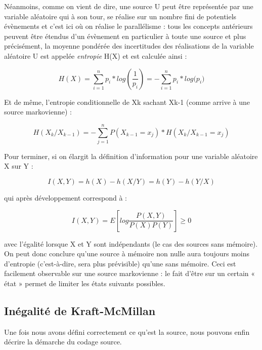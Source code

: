 \documentclass[a4paper,12pt,french]{article}
\begin{document}
    Néanmoins, comme on vient de dire, une source U peut être représentée par une variable aléatoire qui à son tour, se réalise sur un nombre fini de potentiels évènements et c’est ici où on réalise le parallélisme : tous les concepts antérieurs peuvent être étendus d’un évènement en particulier à toute une source et plus précisément, la moyenne pondérée des incertitudes des réalisations de la variable aléatoire U est appelée \textit{entropie} H(X) et est calculée ainsi :

    \begin{equation}
    H(X) = \sum_{i=1}^{n} p_{i} * log (\frac{1}{p_{i}}) = - \sum_{i=1}^{n} {p_{i} * log (p_{i}}) 
    \end{equation}

    Et de même, l’entropie conditionnelle de Xk sachant Xk-1 (comme arrive à une source markovienne) :
    
    \begin{equation}
    H(X_{k}/X_{k-1}) = - \sum_{j=1}^{n} P(X_{k-1} = x_{j}) * H(X_{k}/X_{k-1} = x_{j}) 
    \end{equation}

    Pour terminer, si on élargit la définition d’information pour une variable aléatoire X sur Y :
    
    \begin{equation}
    I (X,Y) = h(X) - h(X/Y) = h(Y) - h(Y/X)
    \end{equation}
    
    qui après développement correspond à :
    
    \begin{equation}
    I(X,Y) = E  \left[log \frac{P(X,Y)}{P(X)P(Y)}  \right] \geq 0
    \end{equation}
    
    avec l’égalité lorsque X et Y sont indépendants (le cas des sources sans mémoire). On peut donc conclure qu’une source à mémoire non nulle aura toujours moins d’entropie (c’est-à-dire, sera plus prévisible) qu’une sans mémoire. Ceci est facilement observable sur une source markovienne : le fait d’être sur un certain « état » permet de limiter les états suivants possibles.

	\subsection{Inégalité de Kraft-McMillan}
	
	Une fois nous avons défini correctement ce qu’est la source, nous pouvons enfin décrire la démarche du codage source. 
    
\end{document}
